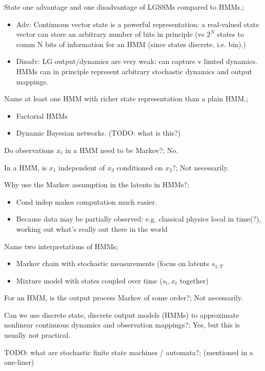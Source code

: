 \documentclass{article}
\begin{document}
State one advantage and one disadvantage of LGSSMs compared to HMMs.; \begin{itemize} \item Adv: Continuous vector state is a powerful representation: a real-valued state vector can store an arbitrary number of bits in principle (vs $2^N$ states to comm N bits of information for an HMM (since states discrete, i.e. bin).) \item Disadv: LG output/dynamics are very weak: can capture v limted dynamics. HMMs can in principle represent arbitrary stochastic dynamics and output mappings.  \end{itemize}

Name at least one HMM with richer state representation than a plain HMM.; \begin{itemize} \item Factorial HMMs \item Dynamic Bayesian networks. (TODO: what is this?) \end{itemize}

Do observations $x_t$ in a HMM need to be Markov?; No.

In a HMM, is $x_1$ independent of $x_3$ conditioned on $x_2$?; Not necessarily.

Why use the Markov assumption in the latents in HMMs?; \begin{itemize} \item Cond indep makes computation much easier.  \item Because data may be partially observed: e.g. classical physics local in time(?), working out what's really out there in the world \end{itemize}

Name two interpretations of HMMs; \begin{itemize} \item Markov chain with stochastic measurements (focus on latents $s_{1:T}$ \item Mixture model with states coupled over time ($s_t, x_t$ together) \end{itemize}

For an HMM, is the output process Markov of some order?; Not necessarily.

Can we use discrete state, discrete output models (HMMs) to approximate nonlinear continuous dynamics and observation mappings?; Yes, but this is usually not practical. 

TODO: what are stochastic finite state machines / automata?; (mentioned in a one-liner)
\end{document}
